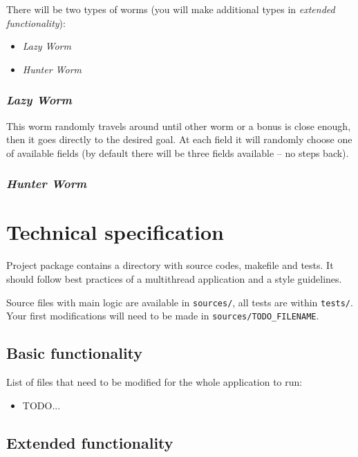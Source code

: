 \documentclass{article}
\begin{document}
There will be two types of worms (you will make additional types in
\textit{extended functionality}):
\begin{itemize}
  \item \textit{Lazy Worm}
  \item \textit{Hunter Worm}
\end{itemize}

\subsubsection{\textit{Lazy Worm}}

This worm randomly travels around until other worm or a bonus is close enough,
then it goes directly to the desired goal. At each field it will randomly choose
one of available fields (by default there will be three fields available -- no
steps back).


\subsubsection{\textit{Hunter Worm}}


\section{Technical specification}

Project package contains a directory with source codes, makefile and tests.
It should follow best practices of a multithread application and a style
guidelines.

Source files with main logic are available in \texttt{sources/}, all tests
are within \texttt{tests/}. Your first modifications will need to be made
in \texttt{sources/TODO\_FILENAME}.

\subsection{Basic functionality}

List of files that need to be modified for the whole application to run:
\begin{itemize}
  \item TODO...
\end{itemize}

\subsection{Extended functionality}
\end{document}
